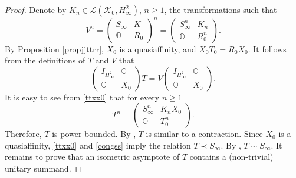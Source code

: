 \documentclass[a4paper,oneside,11pt]{amsart}
\numberwithin{equation}{section}
\theoremstyle{plain}
\theoremstyle{definition}
\begin{document}
\begin{proof}
Denote by  $K_n\in\mathcal L(\mathcal K_0,H^2_\infty)$, $n\geq 1$, the transformations such that 
$$V^n=\begin{pmatrix}S_\infty & K\\ \mathbb O& R_0\end{pmatrix}^n =\begin{pmatrix}S_\infty^n & K_n\\ \mathbb O& R_0^n\end{pmatrix}. $$
By Proposition \ref{propjjttrr},  $X_0$  is a quasiaffinity, and  $X_0T_0=R_0X_0$. 
It follows from the definitions of $T$ and $V$ that 
 \begin{equation}\label{ttxx0}
\begin{pmatrix}I_{H^2_\infty} &\mathbb O \\  \mathbb O& X_0\end{pmatrix}T=V
\begin{pmatrix}I_{H^2_\infty} &\mathbb O \\  \mathbb O& X_0\end{pmatrix}.\end{equation}
It is easy to see from \eqref{ttxx0} that  for every $n\geq 1$ 
$$T^n=\begin{pmatrix}S_\infty^n& K_nX_0\\ \mathbb O& T_0^n\end{pmatrix}.$$
Therefore, $T$ is power bounded. By {\cite[Corollary 4.2]{Cas}}, $T$ is similar to a contraction. 
 Since $X_0$ is a quasiaffinity, \eqref{ttxx0} and \eqref{congss} imply the relation $T\prec S_\infty$. 
By {\cite[Corollary 3]{tak}}, $T\sim S_\infty$. It remains  to prove that an isometric asymptote of $T$ contains  a (non-trivial) unitary summand. 


\end{proof}
\end{document}

